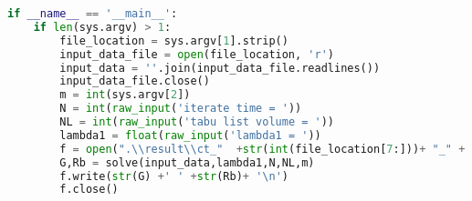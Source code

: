 \begin{lstlisting}[language = Python]
if __name__ == '__main__':
	if len(sys.argv) > 1:
		file_location = sys.argv[1].strip()
		input_data_file = open(file_location, 'r')
		input_data = ''.join(input_data_file.readlines())
		input_data_file.close()
		m = int(sys.argv[2])
		N = int(raw_input('iterate time = '))
		NL = int(raw_input('tabu list volume = '))
		lambda1 = float(raw_input('lambda1 = '))
		f = open(".\\result\\ct_"  +str(int(file_location[7:]))+ "_" + str(m) + "_" + str(lambda1),'w')
		G,Rb = solve(input_data,lambda1,N,NL,m)
		f.write(str(G) +' ' +str(Rb)+ '\n')
		f.close()
\end{lstlisting}